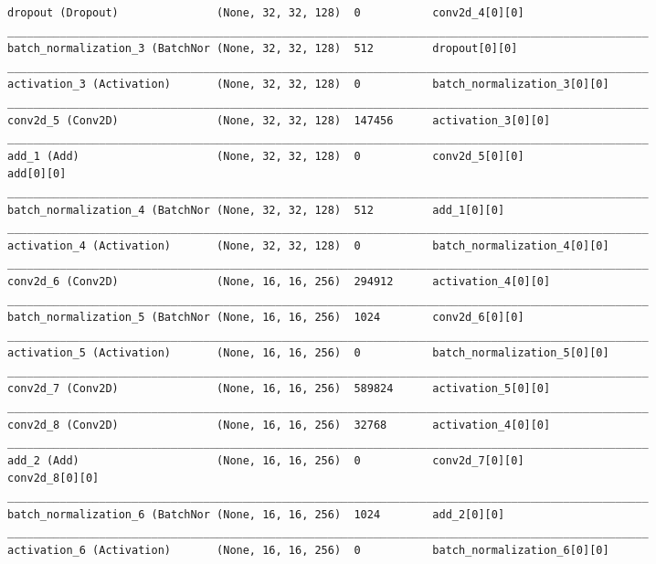 \documentclass[12pt]{article}
\begin{document}
\begin{adjustwidth}{-50pt}{0pt}
\begin{Verbatim}
dropout (Dropout)               (None, 32, 32, 128)  0           conv2d_4[0][0]
__________________________________________________________________________________________________
batch_normalization_3 (BatchNor (None, 32, 32, 128)  512         dropout[0][0]
__________________________________________________________________________________________________
activation_3 (Activation)       (None, 32, 32, 128)  0           batch_normalization_3[0][0]
__________________________________________________________________________________________________
conv2d_5 (Conv2D)               (None, 32, 32, 128)  147456      activation_3[0][0]
__________________________________________________________________________________________________
add_1 (Add)                     (None, 32, 32, 128)  0           conv2d_5[0][0]
add[0][0]
__________________________________________________________________________________________________
batch_normalization_4 (BatchNor (None, 32, 32, 128)  512         add_1[0][0]
__________________________________________________________________________________________________
activation_4 (Activation)       (None, 32, 32, 128)  0           batch_normalization_4[0][0]
__________________________________________________________________________________________________
conv2d_6 (Conv2D)               (None, 16, 16, 256)  294912      activation_4[0][0]
__________________________________________________________________________________________________
batch_normalization_5 (BatchNor (None, 16, 16, 256)  1024        conv2d_6[0][0]
__________________________________________________________________________________________________
activation_5 (Activation)       (None, 16, 16, 256)  0           batch_normalization_5[0][0]
__________________________________________________________________________________________________
conv2d_7 (Conv2D)               (None, 16, 16, 256)  589824      activation_5[0][0]
__________________________________________________________________________________________________
conv2d_8 (Conv2D)               (None, 16, 16, 256)  32768       activation_4[0][0]
__________________________________________________________________________________________________
add_2 (Add)                     (None, 16, 16, 256)  0           conv2d_7[0][0]
conv2d_8[0][0]
__________________________________________________________________________________________________
batch_normalization_6 (BatchNor (None, 16, 16, 256)  1024        add_2[0][0]
__________________________________________________________________________________________________
activation_6 (Activation)       (None, 16, 16, 256)  0           batch_normalization_6[0][0]

\end{Verbatim}
\end{adjustwidth}
\end{document}
